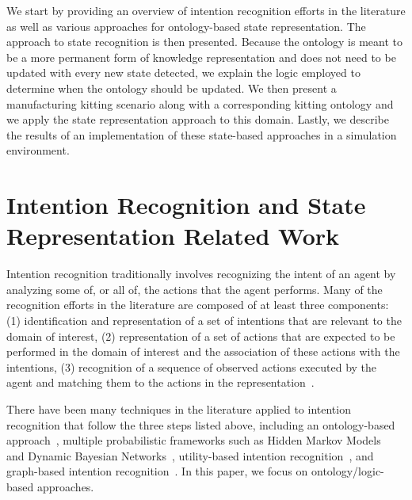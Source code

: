 \documentclass[preprint,12pt]{elsarticle}
\begin{document}
We start by providing an overview of intention recognition efforts in the literature as well as various approaches for ontology-based state representation. The approach to state recognition is then presented. Because the ontology is meant to be a more permanent form of knowledge representation and does not need to be updated with every new state detected, we explain the logic employed to determine when the ontology should be updated. We then present a manufacturing kitting scenario along with a corresponding kitting ontology and we apply the state representation approach to this domain. Lastly, we describe the results of an implementation of these state-based approaches in a simulation environment.
\section{Intention Recognition and State Representation Related Work }\label{S:section1}
Intention recognition traditionally involves recognizing the intent of an agent by analyzing some of, or all of, the actions that the agent performs. Many of the recognition efforts in the literature are composed of at least three components: (1) identification and representation of a set of intentions that are relevant to the domain of interest, (2) representation of a set of actions that are expected to be performed in the domain of interest and the association of these actions with the intentions, (3) recognition of a sequence of observed actions executed by the agent and matching them to the actions in the representation~\cite{SADRI.2011}.


There have been many techniques in the literature applied to intention recognition that follow the three steps listed above, including an ontology-based approach~\cite{JEON.ICMUE.2008}, multiple probabilistic frameworks such as  Hidden Markov Models~\cite{KELLEY.ICHRI.2008} and Dynamic Bayesian Networks~\cite{SCHREMPF.ICAR.2005}, utility-based intention recognition~\cite{MAO.AAMAS.2004}, and graph-based intention recognition~\cite{YOUN.IJASET.2008}. In this paper, we focus on ontology/logic-based approaches.
\end{document}
